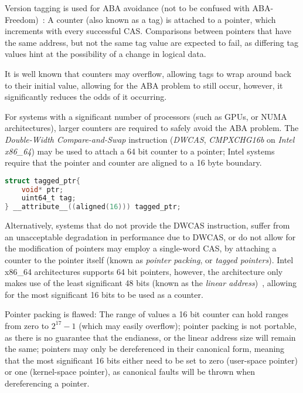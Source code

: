 Version tagging is used for ABA avoidance (not to be confused with
ABA-Freedom)~\citep{dechev2010understanding}:
A counter (also known as a tag) is attached to a pointer, which increments with
every successful CAS. Comparisons between pointers that have the same address,
but not the same tag value are expected to fail, as differing tag values hint
at the possibility of a change in logical data.

It is well known that counters may overflow, allowing tags to wrap around back
to their initial value, allowing for the ABA problem to still occur, however,
it significantly reduces the odds of it occurring.

For systems with a significant number of processors (such as GPUs, or NUMA
architectures), larger counters are required  to safely avoid the ABA problem.
The \emph{Double-Width Compare-and-Swap} instruction (\emph{DWCAS}, \emph{CMPXCHG16b} on
\emph{Intel x86\_64}) may be used to attach a 64 bit counter to a pointer; Intel
systems require that the pointer and counter are aligned to a 16 byte boundary.

\begin{lstlisting}[language=C,caption={Struct aligned to 16 bytes in order to be used with DWCAS.}]
struct tagged_ptr{
    void* ptr;
    uint64_t tag;
} __attribute__((aligned(16))) tagged_ptr;
\end{lstlisting}

Alternatively, systems that do not provide the DWCAS instruction, suffer from
an unacceptable degradation in performance due to DWCAS, or do not allow for
the modification of pointers may employ a single-word CAS, by attaching a
counter to the pointer itself (known as \emph{pointer packing}, or \emph{tagged
pointers}). Intel x86\_64 architectures supports 64 bit pointers, however, the
architecture only makes use of the least significant 48 bits (known as the
\emph{linear address})~\citep[Section~3.3.7.1]{intel2021system}, allowing for
the most significant 16 bits to be used as a counter.

Pointer packing is flawed: The range of values a 16 bit counter can hold ranges
from zero to $2^{17}-1$ (which may easily overflow); pointer packing is not
portable, as there is no guarantee that the endianess, or the linear address
size will remain the same; pointers may only be dereferenced in their canonical
form, meaning that the most significant 16 bits either need to be set to zero
(user-space pointer) or one (kernel-space pointer), as canonical faults will be
thrown when dereferencing a pointer.